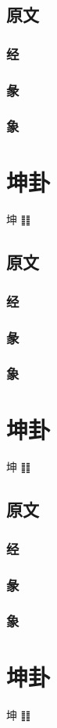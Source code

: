 \documentclass[12pt,oneside]{book}
\begin{document}
\section{原文}
\subsection{经}
\subsection{彖}
\subsection{象}
\chapter{坤卦}
坤 ䷁

\section{原文}
\subsection{经}
\subsection{彖}
\subsection{象}
\chapter{坤卦}
坤 ䷁

\section{原文}
\subsection{经}
\subsection{彖}
\subsection{象}
\chapter{坤卦}
坤 ䷁
\end{document}
